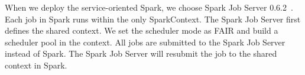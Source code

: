 
When we deploy the service-oriented Spark, we choose Spark Job Server 0.6.2~\cite{www:jobserver}. Each job in Spark runs within the only {\ttfamily \small SparkContext}. The Spark Job Server first defines the shared context. We set the scheduler mode as FAIR and build a scheduler pool in the context. 
All jobs are submitted to the Spark Job Server instead of Spark. The Spark Job Server will resubmit the job to the shared context in Spark.

